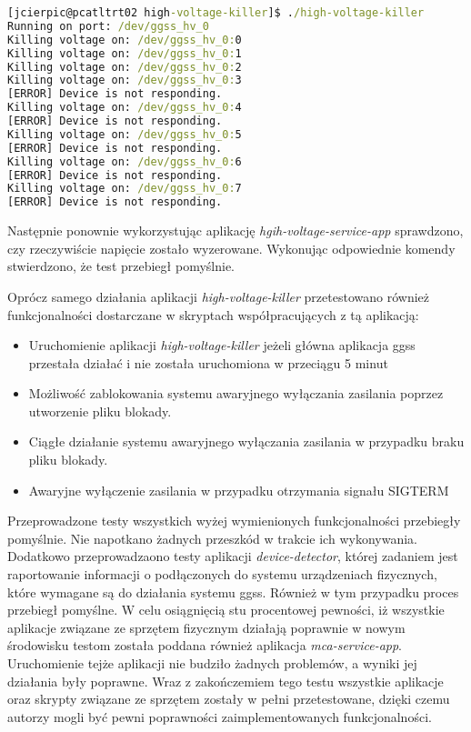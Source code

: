 \begin{lstlisting}[language=cmd,caption={Uruchomienie aplikacji \emph{high-voltage-killer}},label={lst:high-voltage-killer},frame=single]
[jcierpic@pcatltrt02 high-voltage-killer]$ ./high-voltage-killer
Running on port: /dev/ggss_hv_0
Killing voltage on: /dev/ggss_hv_0:0
Killing voltage on: /dev/ggss_hv_0:1
Killing voltage on: /dev/ggss_hv_0:2
Killing voltage on: /dev/ggss_hv_0:3
[ERROR] Device is not responding.
Killing voltage on: /dev/ggss_hv_0:4
[ERROR] Device is not responding.
Killing voltage on: /dev/ggss_hv_0:5
[ERROR] Device is not responding.
Killing voltage on: /dev/ggss_hv_0:6
[ERROR] Device is not responding.
Killing voltage on: /dev/ggss_hv_0:7
[ERROR] Device is not responding.
\end{lstlisting}

Następnie ponownie wykorzystując aplikację \emph{hgih-voltage-service-app} sprawdzono, czy rzeczywiście napięcie zostało wyzerowane. Wykonując odpowiednie komendy stwierdzono, że test przebiegł pomyślnie.

Oprócz samego działania aplikacji \emph{high-voltage-killer} przetestowano również funkcjonalności dostarczane w skryptach współpracujących z tą aplikacją:
\begin{itemize}
    \item Uruchomienie aplikacji \emph{high-voltage-killer} jeżeli główna aplikacja ggss przestała działać i nie została uruchomiona w przeciągu 5 minut
    \item Możliwość zablokowania systemu awaryjnego wyłączania zasilania poprzez utworzenie pliku blokady.
    \item Ciągłe działanie systemu awaryjnego wyłączania zasilania w przypadku braku pliku blokady.
    \item Awaryjne wyłączenie zasilania w przypadku otrzymania signału SIGTERM
\end{itemize}

Przeprowadzone testy wszystkich wyżej wymienionych funkcjonalności przebiegły pomyślnie. Nie napotkano żadnych przeszkód w trakcie ich wykonywania.
Dodatkowo przeprowadzaono testy aplikacji \emph{device-detector}, której zadaniem jest raportowanie informacji o podłączonych do systemu urządzeniach fizycznych, które wymagane są do działania systemu ggss. Również w tym przypadku proces przebiegł pomyślne. W celu osiągnięcią stu procentowej pewności, iż wszystkie aplikacje związane ze sprzętem fizycznym działają poprawnie w nowym środowisku testom została poddana również aplikacja \emph{mca-service-app}. Uruchomienie tejże aplikacji nie budziło żadnych problemów, a wyniki jej działania były poprawne. Wraz z zakończemiem tego testu wszystkie aplikacje oraz skrypty związane ze sprzętem zostały w pełni przetestowane, dzięki czemu autorzy mogli być pewni poprawności zaimplementowanych funkcjonalności.



